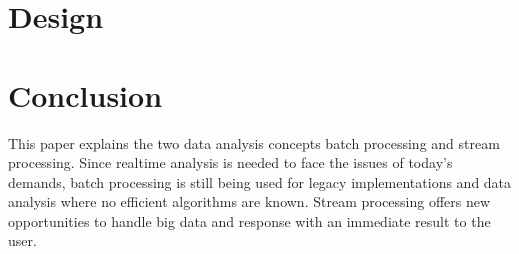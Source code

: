 \documentclass{article}
\begin{document}
\section{Design} \label{s_stream}


\section{Conclusion}\label{s_concl}

This paper explains the two data analysis concepts batch processing and stream processing. Since realtime analysis is needed to face the issues of today's demands, batch processing is still being used for legacy implementations and data analysis where no efficient algorithms are known. Stream processing offers new opportunities to handle big data and response with an immediate result to the user.




\end{document}
